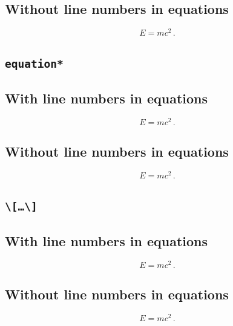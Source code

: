 \subsection*{Without line numbers in equations}
\nextlipsum
\begin{linenomath*}
\begin{equation}
  E = m c^2 \,.
\end{equation}
\end{linenomath*}
\nextlipsum

\subsection*{\texttt{equation*}}

\subsection*{With line numbers in equations}
\nextlipsum
\begin{equation*}
  E = m c^2 \,.
\end{equation*}
\nextlipsum

\subsection*{Without line numbers in equations}
\nextlipsum
\begin{linenomath*}
\begin{equation*}
  E = m c^2 \,.
\end{equation*}
\end{linenomath*}
\nextlipsum

\subsection*{\texttt{\textbackslash[\ldots\textbackslash]}}

\subsection*{With line numbers in equations}
\nextlipsum
\[
  E = m c^2 \,.
\]
\nextlipsum

\subsection*{Without line numbers in equations}
\nextlipsum
\begin{linenomath*}
\[
  E = m c^2 \,.
\]
\end{linenomath*}
\nextlipsum


